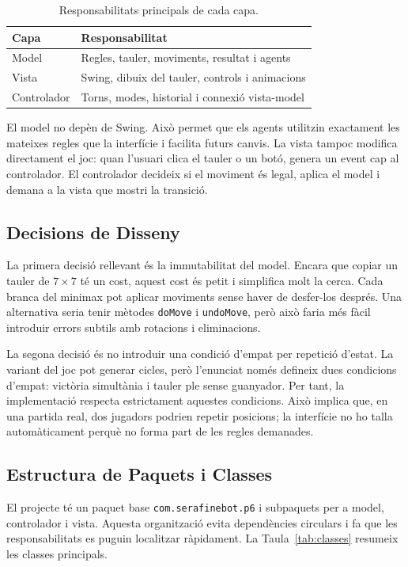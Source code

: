 \documentclass[conference,compsoc]{IEEEtran}
\begin{document}
\begin{table}[H]
\centering
\caption{Responsabilitats principals de cada capa.}
\label{tab:mvc}
\begin{tabular}{ll}
\toprule
Capa & Responsabilitat \\
\midrule
Model & Regles, tauler, moviments, resultat i agents \\
Vista & Swing, dibuix del tauler, controls i animacions \\
Controlador & Torns, modes, historial i connexió vista-model \\
\bottomrule
\end{tabular}
\end{table}

El model no depèn de Swing. Això permet que els agents utilitzin exactament les
mateixes regles que la interfície i facilita futurs canvis.
La vista tampoc modifica directament el joc: quan l'usuari
clica el tauler o un botó, genera un event cap al controlador. El controlador
decideix si el moviment és legal, aplica el model i demana a la vista que mostri
la transició.

\subsection{Decisions de Disseny}

La primera decisió rellevant és la immutabilitat del model. Encara que copiar un
tauler de $7\times7$ té un cost, aquest cost és petit i simplifica molt la cerca.
Cada branca del minimax pot aplicar moviments sense haver de desfer-los després.
Una alternativa seria tenir mètodes \texttt{doMove} i \texttt{undoMove}, però això
faria més fàcil introduir errors subtils amb rotacions i eliminacions.

La segona decisió és no introduir una condició d'empat per repetició d'estat. La
variant del joc pot generar cicles, però l'enunciat només defineix dues condicions
d'empat: victòria simultània i tauler ple sense guanyador. Per tant, la
implementació respecta estrictament aquestes condicions. Això implica que, en una
partida real, dos jugadors podrien repetir posicions; la interfície no ho talla
automàticament perquè no forma part de les regles demanades.

\subsection{Estructura de Paquets i Classes}

El projecte té un paquet base \texttt{com.serafinebot.p6} i subpaquets per a model,
controlador i vista. Aquesta organització evita dependències circulars i fa que
les responsabilitats es puguin localitzar ràpidament. La Taula~\ref{tab:classes}
resumeix les classes principals.
\end{document}
